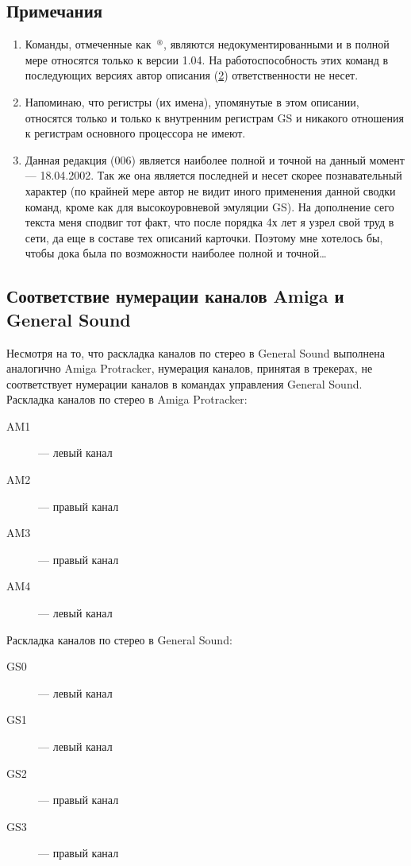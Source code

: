 \documentclass[a4paper,11pt]{article}
\DeclareRobustCommand{\Cyrax}{\texorpdfstring{\(^\circledast\)}{\circledast}}
\begin{document}
\subsection{Примечания}
\begin{enumerate}
\item Команды, отмеченные как~\Cyrax,  являются недокументированными и в полной мере относятся только к версии 1.04.
На работоспособность этих команд в последующих версиях автор описания (\hyperref[Cyrax]{2}) ответственности не несет.
\item Напоминаю, что регистры (их имена), упомянутые в этом описании, относятся только и только к внутренним регистрам GS и никакого отношения к регистрам основного процессора не имеют.
\item Данная редакция (006) является наиболее полной и точной на данный момент --- 18.04.2002. Так же она является последней и несет скорее познавательный характер (по крайней мере автор не видит иного применения данной сводки команд, кроме как для высокоуровневой эмуляции GS).
На дополнение сего текста меня сподвиг тот факт, что после порядка 4х лет я узрел свой труд в сети, да еще в составе тех описаний карточки. Поэтому мне хотелось бы, чтобы дока была по возможности наиболее полной и точной\ldots
\end{enumerate}

\subsection{Соответствие нумерации каналов Amiga и General Sound\label{sec:chn}}
Несмотря на то, что раскладка каналов по стерео в General Sound выполнена аналогично Amiga Protracker, нумерация каналов, принятая в трекерах, не соответствует нумерации каналов в командах управления General Sound.
Раскладка каналов по стерео в Amiga Protracker:
\begin{description}
\item[AM1] --- левый канал
\item[AM2] --- правый канал
\item[AM3] --- правый канал
\item[AM4] --- левый канал
\end{description}

Раскладка каналов по стерео в General Sound:
\begin{description}
\item[GS0] --- левый канал
\item[GS1] --- левый канал
\item[GS2] --- правый канал
\item[GS3] --- правый канал
\end{description}
\end{document}
